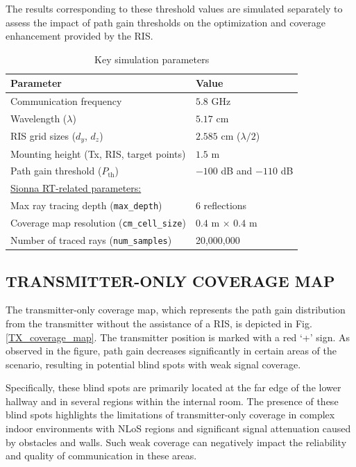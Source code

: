 \documentclass{IEEEoj}
\begin{document}
The results corresponding to these threshold values are simulated separately to assess the impact of path gain thresholds on the optimization and coverage enhancement provided by the RIS.

\begin{table}[t]
	\centering
	\caption{Key simulation parameters}
	\begin{tabular}{l l}
		\toprule
		\textbf{Parameter} & \textbf{Value} \\
		\midrule
		Communication frequency & $5.8$ GHz \\
		Wavelength ($\lambda$) & $5.17$ cm \\
		RIS grid sizes ($d_y$, $d_z$) & $2.585$ cm ($\lambda/2$) \\
		Mounting height (Tx, RIS, target points) & $1.5$ m \\
		Path gain threshold ($P_{\text{th}}$) & $-100$ dB and $-110$ dB \\
		\underline{Sionna RT-related parameters:} & \\
		Max ray tracing depth (\texttt{max\_depth}) & 6 reflections \\
		Coverage map resolution (\texttt{cm\_cell\_size}) & $0.4$ m × $0.4$ m \\
		Number of traced rays (\texttt{num\_samples}) & 20,000,000 \\
		\bottomrule
	\end{tabular}
	\label{tab:sim_params}
\end{table}

\subsection{TRANSMITTER-ONLY COVERAGE MAP}
The transmitter-only coverage map, which represents the path gain distribution from the transmitter without the assistance of a RIS, is depicted in Fig. \ref{TX_coverage_map}. The transmitter position is marked with a red `+' sign. As observed in the figure, path gain decreases significantly in certain areas of the scenario, resulting in potential blind spots with weak signal coverage.

Specifically, these blind spots are primarily located at the far edge of the lower hallway and in several regions within the internal room. The presence of these blind spots highlights the limitations of transmitter-only coverage in complex indoor environments with NLoS regions and significant signal attenuation caused by obstacles and walls. Such weak coverage can negatively impact the reliability and quality of communication in these areas.
\end{document}
